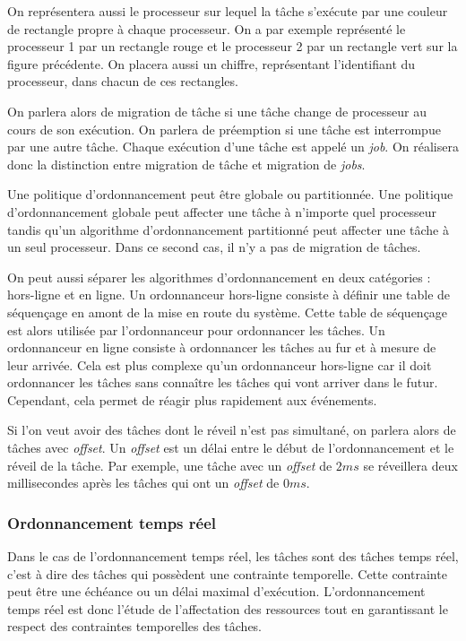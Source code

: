 On représentera aussi le processeur sur lequel la tâche s'exécute par une couleur de rectangle propre à chaque processeur. On a par exemple représenté le processeur 1 par un rectangle rouge et le processeur 2 par un rectangle vert sur la figure précédente. On placera aussi un chiffre, représentant l'identifiant du processeur, dans chacun de ces rectangles.

On parlera alors de migration de tâche si une tâche change de processeur au cours de son exécution. On parlera de préemption si une tâche est interrompue par une autre tâche.
Chaque exécution d'une tâche est appelé un \textit{job}. On réalisera donc la distinction entre migration de tâche et migration de \textit{jobs}.

Une politique d'ordonnancement peut être globale ou partitionnée. Une politique d'ordonnancement globale peut affecter une tâche à n'importe quel processeur tandis qu'un algorithme d'ordonnancement partitionné peut affecter une tâche à un seul processeur. Dans ce second cas, il n'y a pas de migration de tâches.

On peut aussi séparer les algorithmes d'ordonnancement en deux catégories : hors-ligne et en ligne. Un ordonnanceur hors-ligne consiste à définir une table de séquençage en amont de la mise en route du système. Cette table de séquençage est alors utilisée par l'ordonnanceur pour ordonnancer les tâches. Un ordonnanceur en ligne consiste à ordonnancer les tâches au fur et à mesure de leur arrivée. Cela est plus complexe qu'un ordonnanceur hors-ligne car il doit ordonnancer les tâches sans connaître les tâches qui vont arriver dans le futur. Cependant, cela permet de réagir plus rapidement aux événements.


Si l'on veut avoir des tâches dont le réveil n'est pas simultané, on parlera alors de tâches avec \textit{offset}. Un \textit{offset} est un délai entre le début de l'ordonnancement et le réveil de la tâche. Par exemple, une tâche avec un \textit{offset} de $2 ms$ se réveillera deux millisecondes après les tâches qui ont un \textit{offset} de $0 ms$.




\subsubsection{Ordonnancement temps réel}
Dans le cas de l'ordonnancement temps réel, les tâches sont des tâches temps réel, c'est à dire des tâches qui possèdent une contrainte temporelle. Cette contrainte peut être une échéance ou un délai maximal d'exécution. L'ordonnancement temps réel est donc l'étude de l'affectation des ressources tout en garantissant le respect des contraintes temporelles des tâches. 

